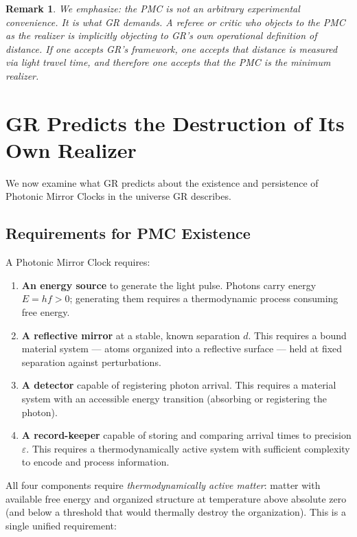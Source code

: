 \documentclass[11pt,a4paper]{article}
\newtheorem{remark}{Remark}
\begin{document}
\begin{remark}
We emphasize: the PMC is not an arbitrary experimental convenience. It is what GR
demands. A referee or critic who objects to the PMC as the realizer is implicitly
objecting to GR's own operational definition of distance. If one accepts GR's
framework, one accepts that distance is measured via light travel time, and therefore
one accepts that the PMC is the minimum realizer.
\end{remark}

\section{GR Predicts the Destruction of Its Own Realizer}
\label{sec:destruction}

We now examine what GR predicts about the existence and persistence of Photonic Mirror
Clocks in the universe GR describes.

\subsection{Requirements for PMC Existence}

A Photonic Mirror Clock requires:
\begin{enumerate}[label=(\alph*)]
\item \textbf{An energy source} to generate the light pulse. Photons carry energy
      $E = hf > 0$; generating them requires a thermodynamic process consuming free
      energy.
\item \textbf{A reflective mirror} at a stable, known separation $d$. This requires
      a bound material system --- atoms organized into a reflective surface --- held
      at fixed separation against perturbations.
\item \textbf{A detector} capable of registering photon arrival. This requires a
      material system with an accessible energy transition (absorbing or registering
      the photon).
\item \textbf{A record-keeper} capable of storing and comparing arrival times to
      precision $\varepsilon$. This requires a thermodynamically active system with
      sufficient complexity to encode and process information.
\end{enumerate}

All four components require \emph{thermodynamically active matter}: matter with
available free energy and organized structure at temperature above absolute zero
(and below a threshold that would thermally destroy the organization). This is a
single unified requirement:
\end{document}
